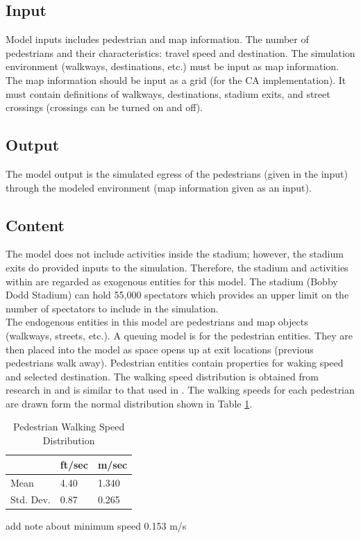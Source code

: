 \documentclass[paper=a4, fontsize=11pt]{scrartcl}
\numberwithin{equation}{section}		%
\numberwithin{figure}{section}			%
\numberwithin{table}{section}		    %
\begin{document}
	\subsection{Input}
	Model inputs includes pedestrian and map information. The number of pedestrians and their 
	characteristics: travel speed and destination. The simulation environment (walkways, 
	destinations, etc.) must be input as map information. The map information should be input as a 
	grid (for the CA implementation). It must contain definitions of walkways, destinations, 
	stadium exits, and street crossings (crossings can be turned on and off).
	
	\subsection{Output}
	The model output is the simulated egress of the pedestrians (given in the input) through the 
	modeled environment (map information given as an input).	
	
	\subsection{Content}
	The model does not include activities inside the stadium; however, the stadium exits do 
	provided inputs to the simulation. Therefore, the stadium and activities within are regarded as 
	exogenous entities for this model. The stadium (Bobby Dodd Stadium) can hold 55,000 spectators 
	\cite{Dodd:Misc} which provides an upper limit on the number of spectators to include in the 
	simulation. \\
	
	\noindent
	The endogenous entities in this model are pedestrians and map objects (walkways, streets, 
	etc.). A queuing model is for the pedestrian entities. They are then placed into the model as 
	space opens up at exit locations (previous pedestrians walk away). Pedestrian entities contain 
	properties for waking speed and selected destination. The walking speed distribution is 
	obtained from research in \cite{young1999evaluation} and is similar to that used in 
	\cite{burstedde2001simulation}. The walking speeds for each pedestrian 
	are drawn form the normal distribution shown in Table \ref{tbl:01}.
	
	\begin{table}[H]
		\centering
		\caption{Pedestrian Walking Speed Distribution \cite{young1999evaluation}}
		\label{tbl:01}
		\begin{tabular}{l|ll}
			& ft/sec & m/sec \\ \hline
			Mean      & 4.40   & 1.340 \\
			Std. Dev. & 0.87   & 0.265
		\end{tabular}
	\end{table}
	add note about minimum speed 0.153 m/s
	
\end{document}
